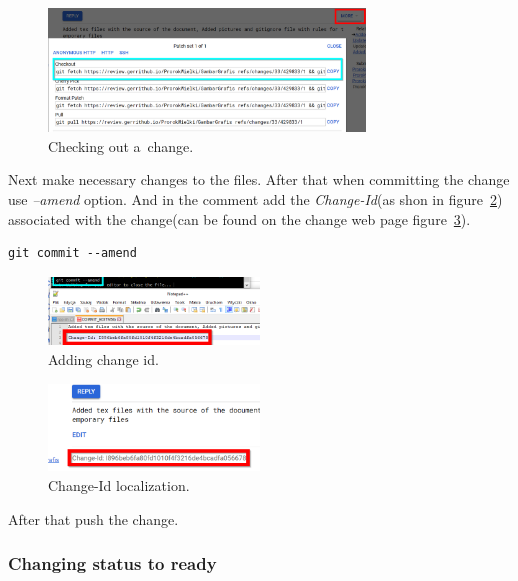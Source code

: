 \documentclass{article}
\begin{document}
\begin{figure}[!ht]
  \centering
  \includegraphics[width=0.75\textwidth]{img/Checkout}
  \caption{Checking out a~change.}
  \label{fig:Checkout}
\end{figure}

Next make necessary changes to the files. After that when committing the change use \textit{--amend} option. And in the comment add the \textit{Change-Id}(as shon in figure~\ref{fig:comment}) associated with the change(can be found on the change web page figure~\ref{fig:changeId}). 

\begin{lstlisting}
git commit --amend
\end{lstlisting}

\begin{figure}[!ht]
  \centering
  \includegraphics[width=0.5\textwidth]{img/comment}
  \caption{Adding change id.}
  \label{fig:comment}
\end{figure}

\begin{figure}[!ht]
  \centering
  \includegraphics[width=0.5\textwidth]{img/changeID}
  \caption{Change-Id localization.}
  \label{fig:changeId}
\end{figure}

\newpage

After that push the change.


\subsubsection{Changing status to ready}
\end{document}
